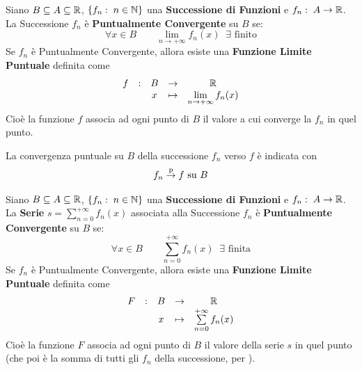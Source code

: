 \begin{definition}
	\label{def:succ_punt_conv}
	Siano $B \subseteq A \subseteq \mathbb{R}$, $\left\{f_n:\; n \in \mathbb{N}\right\}$ una \textbf{Successione di Funzioni} e $f_n:\; A \to \mathbb{R}$.\\
	La Successione $f_n$ è \textbf{Puntualmente Convergente} su $B$ se:
	\[\forall x \in B \qquad \lim\limits_{n \to +\infty} f_n(x) \;\; \exists \text{ finito}\]
	Se $f_n$ è Puntualmente Convergente, allora esiste una \textbf{Funzione Limite Puntuale} definita come
	\[\begin{array}{ccccc} {f} & : & {B} & \to & {\mathbb{R}} \\ & & {x} & \mapsto & {\lim\limits_{n \to +\infty} f_n(x)} \\ \end{array}\]
	Cioè la funzione $f$ associa ad ogni punto di $B$ il valore a cui converge la $f_n$ in quel punto.

	\vspace*{\baselineskip}
	La convergenza puntuale su $B$ della successione $f_n$ verso $f$ è indicata con
	\[f_n \overset{\text{p}}{\to} f \text{ su } B\]
\end{definition}
\begin{definition}
	Siano $B \subseteq A \subseteq \mathbb{R}$, $\left\{f_n:\; n \in \mathbb{N}\right\}$ una \textbf{Successione di Funzioni} e $f_n:\; A \to \mathbb{R}$.\\
	La \textbf{Serie} $s = \sum\limits_{n = 0}^{+\infty} f_n(x)$ associata alla Successione $f_n$ è \textbf{Puntualmente Convergente} su $B$ se:
	\[\forall x \in B \qquad \sum\limits_{n = 0}^{+\infty} f_n(x) \;\; \exists \text{ finita}\]
	Se $f_n$ è Puntualmente Convergente, allora esiste una \textbf{Funzione Limite Puntuale} definita come
	\[\begin{array}{ccccc} {F} & : & {B} & \to & {\mathbb{R}} \\ & & {x} & \mapsto & {\sum\limits_{n = 0}^{+\infty} f_n(x)} \\ \end{array}\]
	Cioè la funzione $F$ associa ad ogni punto di $B$ il valore della serie $s$ in quel punto (che poi è la somma di tutti gli $f_n$ della successione, per ).
\end{definition}
